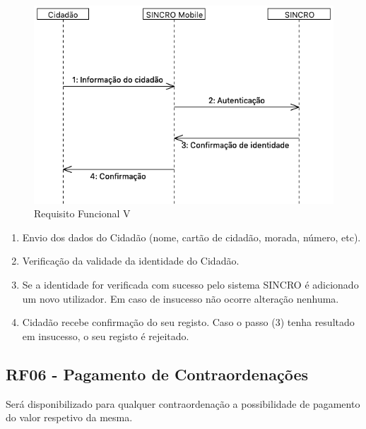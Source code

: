 \documentclass{article}
\begin{document}
\begin{figure}
\centering
\includegraphics[scale=0.3]{./adoc_images/sequence/rf05.png}
\caption{Requisito Funcional V}
\end{figure}

\begin{enumerate}
\def\labelenumi{\arabic{enumi}.}
\item
  Envio dos dados do Cidadão (nome, cartão de cidadão, morada, número,
  etc).
\item
  Verificação da validade da identidade do Cidadão.
\item
  Se a identidade for verificada com sucesso pelo sistema SINCRO é
  adicionado um novo utilizador. Em caso de insucesso não ocorre
  alteração nenhuma.
\item
  Cidadão recebe confirmação do seu registo. Caso o passo (3) tenha
  resultado em insucesso, o seu registo é rejeitado.
\end{enumerate}

\hypertarget{_rf06_pagamento_de_contraordena_es}{%
\subsection{RF06 - Pagamento de
Contraordenações}\label{_rf06_pagamento_de_contraordena_es}}

Será disponibilizado para qualquer contraordenação a possibilidade de
pagamento do valor respetivo da mesma.
\end{document}

